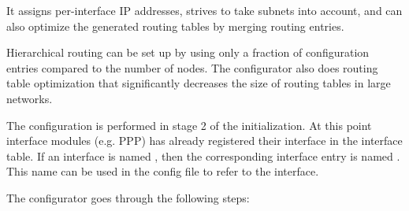 It assigns per-interface IP addresses, strives to take subnets into account,
and can also optimize the generated routing tables by merging routing entries.

Hierarchical routing can be set up by using only a fraction of configuration
entries compared to the number of nodes. The configurator also does
routing table optimization that significantly decreases the size of routing
tables in large networks.

The configuration is performed in stage 2 of the initialization. At this
point interface modules (e.g. PPP) has already registered their interface
in the interface table. If an interface is named , then the
corresponding interface entry is named . This name can be used
in the config file to refer to the interface.

The configurator goes through the following steps:

